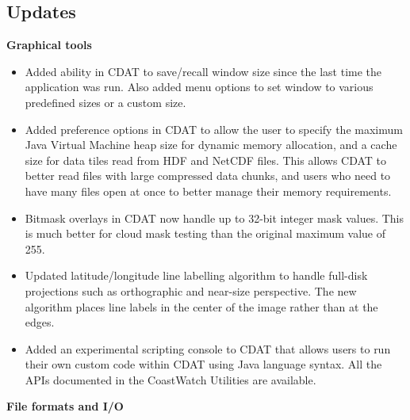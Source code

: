 \subsection*{ Updates}

\hspace{0.4cm} {\bf Graphical tools}

\begin{itemize}

  \item Added ability in CDAT to save/recall window size since the last time
  the application was run.  Also added menu options to set window to various
  predefined sizes or a custom size.

  \item Added preference options in CDAT to allow the user to specify the
  maximum Java Virtual Machine heap size for dynamic memory allocation, and
  a cache size for data tiles read from HDF and NetCDF files.  This allows CDAT
  to better read files with large compressed data chunks, and users who need to
  have many files open at once to better manage their memory requirements.

  \item Bitmask overlays in CDAT now handle up to 32-bit integer mask values.
  This is much better for cloud mask testing than the original maximum value
  of 255.

  \item Updated latitude/longitude line labelling algorithm to handle full-disk
  projections such as orthographic and near-size perspective.  The new
  algorithm places line labels in the center of the image rather than at the
  edges.

  \item Added an experimental scripting console to CDAT that allows users to
  run their own custom code within CDAT using Java language syntax.  All the
  APIs documented in the CoastWatch Utilities are available.

\end{itemize}

\hspace{0.4cm} {\bf File formats and I/O}

